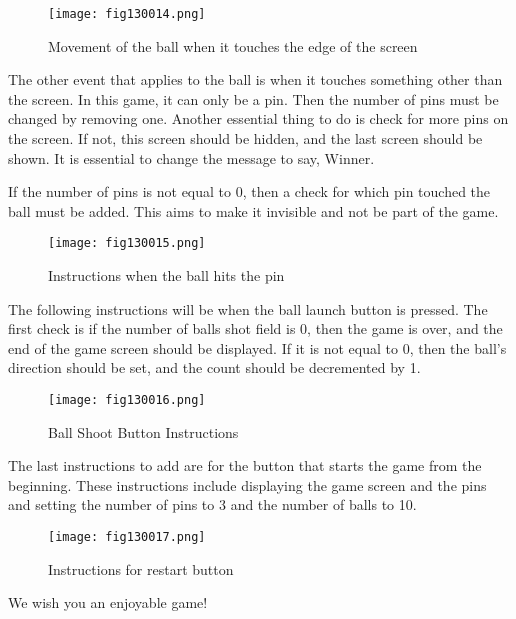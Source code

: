 \begin{figure}[H]
   \centering
   \texttt{[image: fig130014.png]}
   \caption{Movement of the ball when it touches the edge of the screen}
\label{fig130014}
\end{figure}

The other event that applies to the ball is when it touches something other than the screen. In this game, it can only be a pin. Then the number of pins must be changed by removing one. Another essential thing to do is check for more pins on the screen. If not, this screen should be hidden, and the last screen should be shown. It is essential to change the message to say, Winner.

If the number of pins is not equal to 0, then a check for which pin touched the ball must be added. This aims to make it invisible and not be part of the game.

\begin{figure}[H]
   \centering
   \texttt{[image: fig130015.png]}
   \caption{Instructions when the ball hits the pin}
\label{fig130015}
\end{figure}

The following instructions will be when the ball launch button is pressed. The first check is if the number of balls shot field is 0, then the game is over, and the end of the game screen should be displayed. If it is not equal to 0, then the ball's direction should be set, and the count should be decremented by 1.

\begin{figure}[H]
   \centering
   \texttt{[image: fig130016.png]}
   \caption{Ball Shoot Button Instructions}
\label{fig130016}
\end{figure}

The last instructions to add are for the button that starts the game from the beginning. These instructions include displaying the game screen and the pins and setting the number of pins to 3 and the number of balls to 10.

\begin{figure}[H]
   \centering
   \texttt{[image: fig130017.png]}
   \caption{Instructions for restart button}
\label{fig130017}
\end{figure}

We wish you an enjoyable game!
